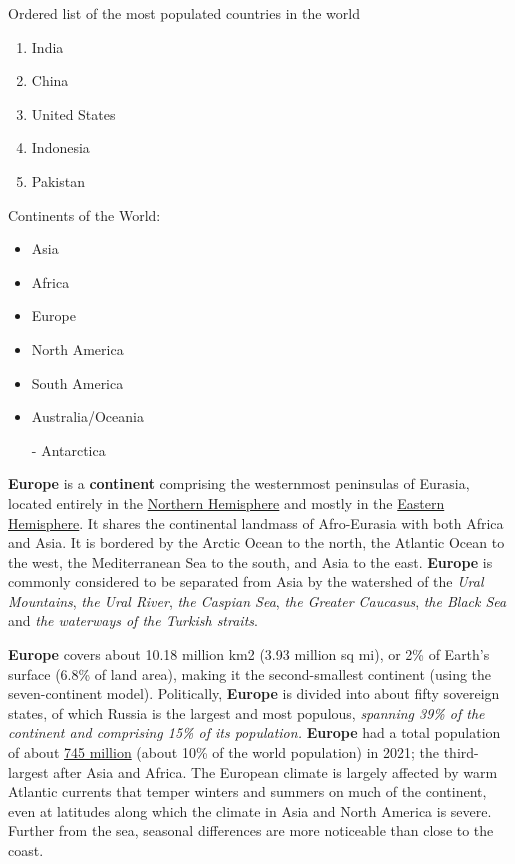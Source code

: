 \bigskip

Ordered list of the most populated countries in the world
\begin{enumerate}
    \item India
    \item China
    \item United States
    \item Indonesia
    \item Pakistan
\end{enumerate}

\newpage

Continents of the World:
\begin{itemize}
    \item Asia
    \item Africa
    \item Europe
    \item North America
    \item South America
    \item Australia/Oceania
    \item[-] Antarctica
\end{itemize}

\hspace{\parindent}\textbf{Europe} is a \textbf{continent} comprising the westernmost peninsulas of Eurasia, located entirely in the \underline{Northern Hemisphere} and mostly in the \underline{Eastern} \underline{Hemisphere}. It shares the continental landmass of Afro-Eurasia with both Africa and Asia. It is bordered by the Arctic Ocean to the north, the Atlantic Ocean to the west, the Mediterranean Sea to the south, and Asia to the east. \textbf{Europe} is commonly considered to be separated from Asia by the watershed of the \textit{Ural Mountains}, \textit{the Ural River}, \textit{the Caspian Sea}, \textit{the Greater Caucasus}, \textit{the Black Sea} and \textit{the waterways of the Turkish straits}.

\hspace{\parindent}\textbf{Europe} covers about 10.18 million km2 (3.93 million sq mi), or 2\% of Earth's surface (6.8\% of land area), making it the second-smallest continent (using the seven-continent model). Politically, \textbf{Europe} is divided into about fifty sovereign states, of which Russia is the largest and most populous, \emph{spanning 39\% of the continent and comprising 15\% of its population.} \textbf{Europe} had a total population of about \underline{745 million} (about 10\% of the world population) in 2021; the third-largest after Asia and Africa. The European climate is largely affected by warm Atlantic currents that temper winters and summers on much of the continent, even at latitudes along which the climate in Asia and North America is severe. Further from the sea, seasonal differences are more noticeable than close to the coast.

\newpage